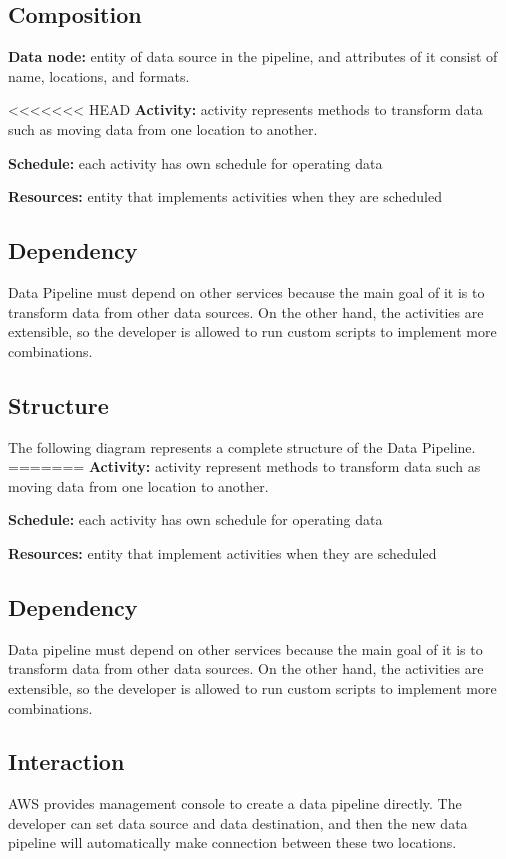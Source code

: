      \subsection{Composition}
     \textbf{Data node:} entity of data source in the pipeline, and attributes of it consist of name, locations, and formats\cite{z5}. 
     
<<<<<<< HEAD
     \noindent\textbf{Activity:} activity represents methods to transform data such as moving data from one location to another. 
     
     \noindent\textbf{Schedule:} each activity has own schedule for operating data
     
     \noindent\textbf{Resources:} entity that implements activities when they are scheduled 
     
	\subsection{Dependency}
     Data Pipeline must depend on other services because the main goal of it is to transform data from other data sources. On the other hand, the activities are extensible, so the developer is allowed to run custom scripts to implement more combinations.
     
    	\subsection{Structure}
The following diagram represents a complete structure of the Data Pipeline. 
=======
     \noindent\textbf{Activity:} activity represent methods to transform data such as moving data from one location to another. 
     
     \noindent\textbf{Schedule:} each activity has own schedule for operating data
     
     \noindent\textbf{Resources:} entity that implement activities when they are scheduled 
     
	\subsection{Dependency}
     Data pipeline must depend on other services because the main goal of it is to transform data from other data sources. On the other hand, the activities are extensible, so the developer is allowed to run custom scripts to implement more combinations.
    
	\subsection{Interaction}
	AWS provides management console to create a data pipeline directly. The developer can set data source and data destination, and then the new data pipeline will automatically make connection between these two locations.  
    
